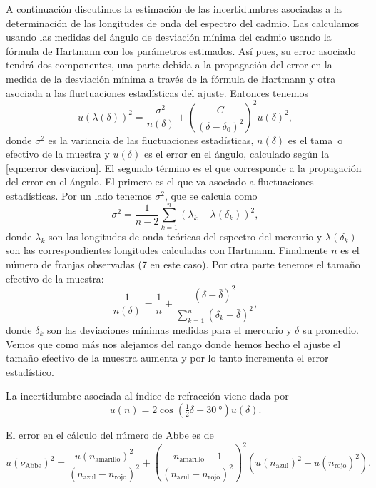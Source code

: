 \documentclass[12pt]{article}
\numberwithin{table}{section}
\numberwithin{figure}{section}
\numberwithin{equation}{section}
\begin{document}
A continuación discutimos la estimación de las incertidumbres asociadas a la determinación de las longitudes de onda del espectro del cadmio. Las calculamos usando las medidas del ángulo de desviación mínima del cadmio usando la fórmula de Hartmann con los parámetros estimados. Así pues, su error asociado tendrá dos componentes, una parte debida a la propagación del error en la medida de la desviación mínima a través de la fórmula de Hartmann y otra asociada a las fluctuaciones estadísticas del ajuste. Entonces tenemos
\begin{equation} \label{eqn:error longitud}
	u(\lambda(\delta))^2 = \frac{\sigma^2}{n(\delta)} + \left(\frac{C}{(\delta - \delta_0)^2}\right)^2 u(\delta)^2,
\end{equation}
donde \( \sigma^2 \) es la variancia de las fluctuaciones estadísticas, \( n(\delta) \) es el tama~o efectivo de la muestra y \( u(\delta) \) es el error en el ángulo, calculado según la \cref{eqn:error desviacion}. El segundo término es el que corresponde a la propagación del error en el ángulo. El primero es el que va asociado a fluctuaciones estadísticas. Por un lado tenemos \( \sigma^2 \), que se calcula como
\begin{equation*}
	\sigma^2 = \frac{1}{n-2} \sum_{k = 1}^{n} (\lambda_k - \lambda(\delta_k))^2,
\end{equation*}
donde \( \lambda_k \) son las longitudes de onda teóricas del espectro del mercurio y \( \lambda(\delta_k) \) son las correspondientes longitudes calculadas con Hartmann. Finalmente \( n \) es el número de franjas observadas (7 en este caso). Por otra parte tenemos el tamaño efectivo de la muestra:
\begin{equation*}
	\frac{1}{n(\delta)} = \frac{1}{n} + \frac{(\delta - \bar{\delta})^2}{\sum_{k = 1}^{n}(\delta_k - \bar{\delta})^2 },
\end{equation*}
donde \( \delta_k \) son las deviaciones mínimas medidas para el mercurio y \( \bar{\delta} \) su promedio. Vemos que como más nos alejamos del rango donde hemos hecho el ajuste el tamaño efectivo de la muestra aumenta y por lo tanto incrementa el error estadístico.

La incertidumbre asociada al índice de refracción viene dada por
\begin{equation} \label{eqn:refraccion}
	u(n) = 2\cos{\left(\tfrac{1}{2}\delta + \SI{30}{\degree}\right)} u(\delta).
\end{equation}

El error en el cálculo del número de Abbe es de
\begin{equation} \label{eqn:error abbe}
	u(\nu_\text{Abbe})^2 = \frac{u(n_\text{amarillo})^2}{(n_\text{azul} - n_\text{rojo})^2} + \left(\frac{n_\text{amarillo} - 1}{(n_\text{azul} - n_\text{rojo})^2}\right)^2(u(n_\text{azul})^2 + u(n_\text{rojo})^2).
\end{equation}
\end{document}
